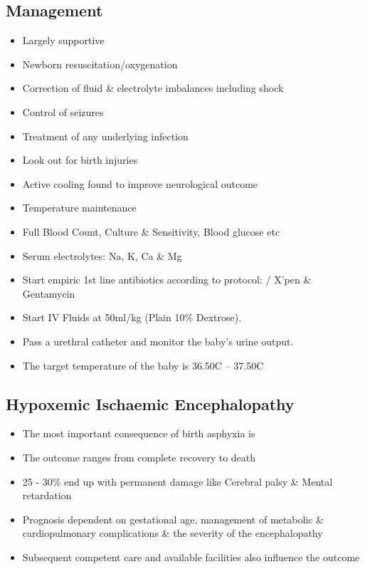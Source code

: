 \documentclass[
  letterpaper,
  DIV=11,
  numbers=noendperiod]{scrreprt}
\providecommand{\tightlist}{%
  \setlength{\itemsep}{0pt}\setlength{\parskip}{0pt}}\usepackage{longtable,booktabs,array}
\begin{document}
\hypertarget{management-1}{%
\subsection{Management}\label{management-1}}

\begin{itemize}
\tightlist
\item
  Largely supportive
\item
  Newborn resuscitation/oxygenation
\item
  Correction of fluid \& electrolyte imbalances including shock
\item
  Control of seizures
\item
  Treatment of any underlying infection
\item
  Look out for birth injuries
\item
  Active cooling found to improve neurological outcome
\item
  Temperature maintenance
\item
  Full Blood Count, Culture \& Sensitivity, Blood glucose etc
\item
  Serum electrolytes: Na, K, Ca \& Mg
\item
  Start empiric 1st line antibiotics according to protocol: / X'pen \&
  Gentamycin
\item
  Start IV Fluids at 50ml/kg (Plain 10\% Dextrose).
\item
  Pass a urethral catheter and monitor the baby's urine output.
\item
  The target temperature of the baby is 36.50C -- 37.50C
\end{itemize}

\hypertarget{hypoxemic-ischaemic-encephalopathy}{%
\subsection{Hypoxemic Ischaemic
Encephalopathy}\label{hypoxemic-ischaemic-encephalopathy}}

\begin{itemize}
\tightlist
\item
  The most important consequence of birth asphyxia is
\item
  The outcome ranges from complete recovery to death
\item
  25 - 30\% end up with permanent damage like Cerebral palsy \& Mental
  retardation
\item
  Prognosis dependent on gestational age, management of metabolic \&
  cardiopulmonary complications \& the severity of the encephalopathy
\item
  Subsequent competent care and available facilities also influence the
  outcome
\end{itemize}
\end{document}
